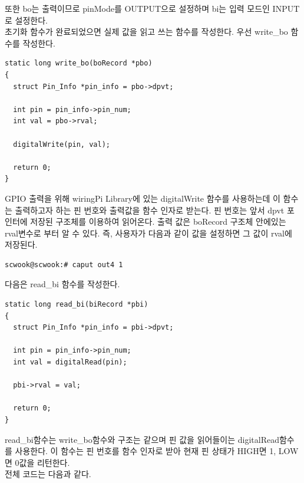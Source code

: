 \documentclass[11pt
  , a4paper
  , article
  , oneside
]{memoir}
\begin{document}
또한 bo는 출력이므로 pinMode를 OUTPUT으로 설정하며 bi는 입력 모드인 INPUT로 설정한다.\\
초기화 함수가 완료되었으면 실제 값을 읽고 쓰는 함수를 작성한다. 우선 write\_bo 함수를 작성한다.
\begin{lstlisting}[style=termstylenumber, caption={Editing \texttt{/etc/fai/NFSROOT}}, label={list:nfsroot-file}]
static long write_bo(boRecord *pbo)
{
  struct Pin_Info *pin_info = pbo->dpvt;

  int pin = pin_info->pin_num;
  int val = pbo->rval;

  digitalWrite(pin, val);

  return 0;
}
\end{lstlisting}
GPIO 출력을 위해 wiringPi Library에 있는 digitalWrite 함수를 사용하는데 이 함수는 출력하고자 
하는 핀 번호와 출력값을 함수 인자로 받는다. 핀 번호는 앞서 dpvt 포인터에 저장된 구조체를 이용하여 
읽어온다. 출력 값은 boRecord 구조체 안에있는 rval변수로 부터 알 수 있다. 즉, 사용자가 다음과 같이 
값을 설정하면 그 값이 rval에 저장된다. 
\begin{lstlisting}[style=termstyle]
scwook@scwook:# caput out4 1
\end{lstlisting}
다음은 read\_bi 함수를 작성한다.
\begin{lstlisting}[style=termstylenumber, caption={Editing \texttt{/etc/fai/NFSROOT}}, label={list:nfsroot-file}]
static long read_bi(biRecord *pbi)
{
  struct Pin_Info *pin_info = pbi->dpvt;

  int pin = pin_info->pin_num;
  int val = digitalRead(pin);

  pbi->rval = val;

  return 0;
}
\end{lstlisting}
read\_bi함수는 write\_bo함수와 구조는 같으며 핀 값을 읽어들이는 digitalRead함수를 사용한다. 
이 함수는 핀 번호를 함수 인자로 받아 현재 핀 상태가 HIGH면 1, LOW면 0값을 리턴한다.\\
전체 코드는 다음과 같다.
\end{document}
